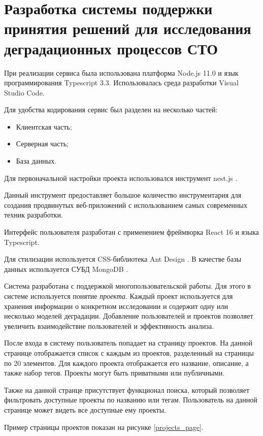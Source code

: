 \section{Разработка системы поддержки принятия решений для исследования деградационных процессов СТО}

При реализации сервиса была использована платформа Node.js 11.0  и язык программирования Typescript 3.3. 
Использовалась среда разработки Visual Studio Code.

Для удобства кодирования сервис был разделен на несколько частей:

\begin{itemize}
    \item Клиентская часть;
    \item Серверная часть;
    \item База данных.
\end{itemize}
Для первоначальной настройки проекта использовался инструмент nest.js \cite{Nest}. 

Данный инструмент предоставляет большое количество инструментария для создания продвинутых веб-приложений с использованием самых современных техник разработки.

Интерфейс пользователя разработан с применением фреймворка React 16 \cite{React} и языка Typescript.

Для стилизации используется CSS-библиотека Ant Design \cite{Antd}.
В качестве базы данных используется СУБД MongoDB \cite{Mongo}.

Система разработана с поддержкой многопользовательской работы. 
Для этого в системе используется понятие \emph{проекта}. 
Каждый проект используется для хранения информации о конкретном исследовании и содержит одну или несколько моделей деградации. 
Добавление пользователей и проектов позволяет увеличить взаимодействие пользователей и эффективность анализа. 

После входа в систему пользователь попадает на страницу проектов.
На данной странице отображается список с каждым из проектов, разделенный на страницы по 20 элементов.
Для каждого проекта отображается его название, описание, а также набор тегов. 
Проекты могут быть приватными или публичными.

Также на данной странце присутствует функционал поиска, который позволяет фильтровать доступные проекты по названию или тегам.
Пользователь на данной странице может видеть все доступные ему проекты.

Пример страницы проектов показан на рисунке \ref{projects_page}.

